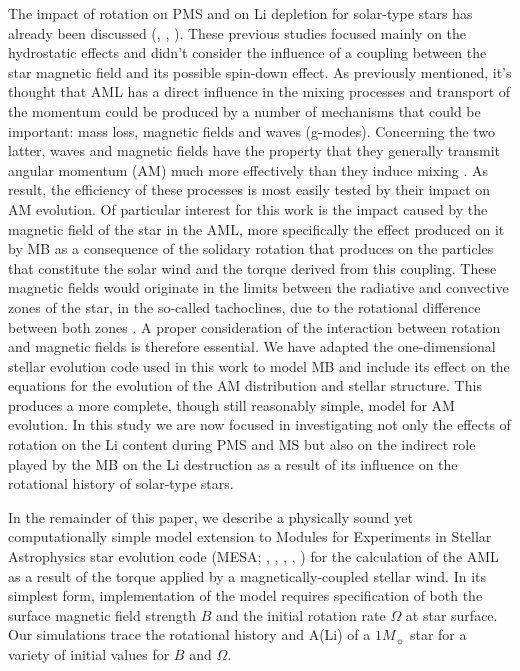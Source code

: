 \documentclass[fleqn,usenatbib]{mnras}
\begin{document}
The impact of rotation on PMS and on Li depletion for solar-type stars has already been discussed (\citet{Pinsonneault1997}, \citet{Jeffries2004}, \citet{Somers2014}). These previous studies focused mainly on the hydrostatic effects and didn't consider the influence of a coupling between the star magnetic field and its possible spin-down effect. As previously mentioned, it's thought that AML has a direct influence in the mixing processes and transport of the momentum could be produced by a number of mechanisms that could be important: mass loss, magnetic fields and waves (g-modes). Concerning the two latter, waves and magnetic fields have the property that they generally transmit angular momentum (AM) much more effectively than they induce mixing \citep{Denissenkov2007}. As result, the efficiency of these processes is most easily tested by their impact on AM evolution. Of particular interest for this work is the impact caused by the magnetic field of the star in the AML, more specifically the effect produced on it by MB as a consequence of the solidary rotation that produces on the particles that constitute the solar wind and the torque derived from this coupling. These magnetic fields would originate in the limits between the radiative and convective zones of the star, in the so-called tachoclines, due to the rotational difference between both zones \citep{Guerrero2016}. A proper consideration of the interaction between rotation and magnetic fields is therefore essential. We have adapted the one-dimensional stellar evolution code used in this work to model MB and include its effect on the equations for the evolution of the AM distribution and stellar structure. This produces a more complete, though still reasonably simple, model for AM evolution. In this study we are now focused in investigating not only the effects of rotation on the Li content during PMS and MS but also on the indirect role played by the MB on the Li destruction as a result of its influence on the rotational history of solar-type stars.\par

In the remainder of this paper, we describe a physically sound yet computationally simple model extension to Modules for Experiments in Stellar Astrophysics star evolution code (MESA; \citeauthor{Paxton2011} \citeyear{Paxton2011}, \citeyear{Paxton2013}, \citeyear{Paxton2015}, \citeyear{Paxton2018}, \citeyear{Paxton2019}) for the calculation of the AML as a result of the torque applied by a magnetically-coupled stellar wind. In its simplest form, implementation of the model requires specification of both the surface magnetic field strength $B$ and the initial  rotation rate $\Omega$ at star surface. Our simulations trace the rotational history and A(Li) of a $1 M_{\sun}$ star for a variety of initial values for $B$ and $\Omega$.\par
\end{document}
